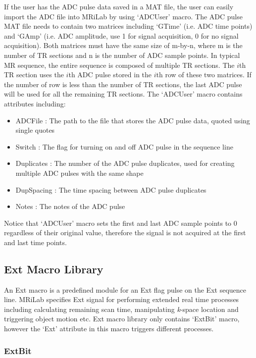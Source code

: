 \documentclass{book}%
\begin{document}
If the user has the ADC pulse data saved in a MAT file, the user can easily import the ADC file into MRiLab by using `ADCUser' macro. The ADC pulse MAT file needs to contain two matrices including `GTime' (i.e. ADC time points) and `GAmp' (i.e. ADC amplitude, use 1 for signal acquisition, 0 for no signal acquisition). Both matrices must have the same size of m-by-n, where m is the number of TR sections and n is the number of ADC sample points. In typical MR sequence, the entire sequence is composed of multiple TR sections. The $i$th TR section uses the $i$th ADC pulse stored in the $i$th row of these two matrices. If the number of row is less than the number of TR sections, the last ADC pulse will be used for all the remaining TR sections. The `ADCUser' macro contains attributes including:

\begin{itemize}
	\item ADCFile : The path to the file that stores the ADC pulse data, quoted using single quotes
	\item Switch : The flag for turning on and off ADC pulse in the sequence line
	\item Duplicates : The number of the ADC pulse duplicates, used for creating multiple ADC pulses with the same shape
	\item DupSpacing : The time spacing between ADC pulse duplicates
	\item Notes : The notes of the ADC pulse 
\end{itemize}

Notice that `ADCUser' macro sets the first and last ADC sample points to 0 regardless of their original value, therefore the signal is not acquired at the first and last time points.

\subsection{Ext Macro Library} \label{subs:ExtMacroLibrary}

An Ext macro is a predefined module for an Ext flag pulse on the Ext sequence line. MRiLab specifies Ext signal for performing extended real time processes including calculating remaining scan time, manipulating \textit{k}-space location and triggering object motion etc. Ext macro library only contains `ExtBit' macro, however the `Ext' attribute in this macro triggers different processes. 

\subsubsection{ExtBit}
\end{document}
